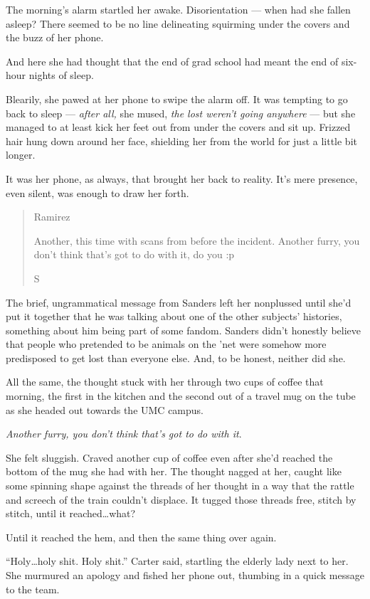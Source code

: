 The morning's alarm startled her awake. Disorientation --- when had she fallen asleep? There seemed to be no line delineating squirming under the covers and the buzz of her phone.

And here she had thought that the end of grad school had meant the end of six-hour nights of sleep.

Blearily, she pawed at her phone to swipe the alarm off. It was tempting to go back to sleep --- \emph{after all,} she mused, \emph{the lost weren't going anywhere} --- but she managed to at least kick her feet out from under the covers and sit up. Frizzed hair hung down around her face, shielding her from the world for just a little bit longer.

It was her phone, as always, that brought her back to reality. It's mere presence, even silent, was enough to draw her forth.

\begin{quote}
Ramirez

Another, this time with scans from before the incident. Another furry, you don't think that's got to do with it, do you :p

S
\end{quote}

The brief, ungrammatical message from Sanders left her nonplussed until she'd put it together that he was talking about one of the other subjects' histories, something about him being part of some fandom. Sanders didn't honestly believe that people who pretended to be animals on the 'net were somehow more predisposed to get lost than everyone else. And, to be honest, neither did she.

All the same, the thought stuck with her through two cups of coffee that morning, the first in the kitchen and the second out of a travel mug on the tube as she headed out towards the UMC campus.

\emph{Another furry, you don't think that's got to do with it}.

She felt sluggish. Craved another cup of coffee even after she'd reached the bottom of the mug she had with her. The thought nagged at her, caught like some spinning shape against the threads of her thought in a way that the rattle and screech of the train couldn't displace. It tugged those threads free, stitch by stitch, until it reached\ldots{}what?

Until it reached the hem, and then the same thing over again.

``Holy\ldots{}holy shit. Holy shit.'' Carter said, startling the elderly lady next to her. She murmured an apology and fished her phone out, thumbing in a quick message to the team.
